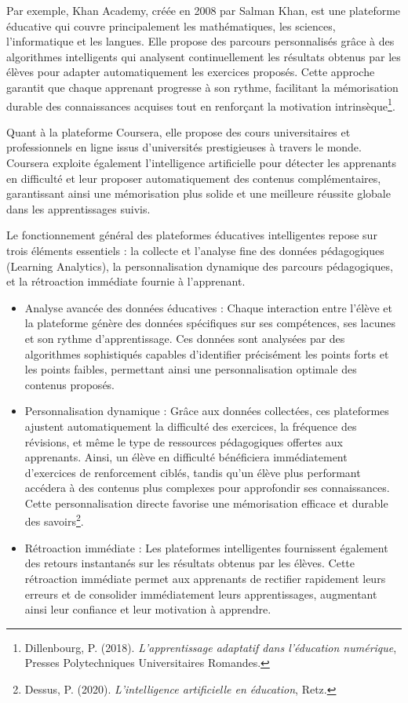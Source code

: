 \documentclass[12pt,a4paper]{report}
\begin{document}
Par exemple, Khan Academy, créée en 2008 par Salman Khan, est une plateforme éducative qui couvre principalement les mathématiques, les sciences, l’informatique et les langues. Elle propose des parcours personnalisés grâce à des algorithmes intelligents qui analysent continuellement les résultats obtenus par les élèves pour adapter automatiquement les exercices proposés. Cette approche garantit que chaque apprenant progresse à son rythme, facilitant la mémorisation durable des connaissances acquises tout en renforçant la motivation intrinsèque\footnote{Dillenbourg, P. (2018). \textit{L’apprentissage adaptatif dans l’éducation numérique}, Presses Polytechniques Universitaires Romandes.}.

Quant à la plateforme Coursera, elle propose des cours universitaires et professionnels en ligne issus d’universités prestigieuses à travers le monde. Coursera exploite également l’intelligence artificielle pour détecter les apprenants en difficulté et leur proposer automatiquement des contenus complémentaires, garantissant ainsi une mémorisation plus solide et une meilleure réussite globale dans les apprentissages suivis.

Le fonctionnement général des plateformes éducatives intelligentes repose sur trois éléments essentiels : la collecte et l’analyse fine des données pédagogiques (Learning Analytics), la personnalisation dynamique des parcours pédagogiques, et la rétroaction immédiate fournie à l’apprenant.

\begin{itemize}

    \item Analyse avancée des données éducatives :
Chaque interaction entre l’élève et la plateforme génère des données spécifiques sur ses compétences, ses lacunes et son rythme d’apprentissage. Ces données sont analysées par des algorithmes sophistiqués capables d’identifier précisément les points forts et les points faibles, permettant ainsi une personnalisation optimale des contenus proposés.

    \item Personnalisation dynamique :
Grâce aux données collectées, ces plateformes ajustent automatiquement la difficulté des exercices, la fréquence des révisions, et même le type de ressources pédagogiques offertes aux apprenants. Ainsi, un élève en difficulté bénéficiera immédiatement d’exercices de renforcement ciblés, tandis qu’un élève plus performant accédera à des contenus plus complexes pour approfondir ses connaissances. Cette personnalisation directe favorise une mémorisation efficace et durable des savoirs\footnote{Dessus, P. (2020). \textit{L’intelligence artificielle en éducation}, Retz.}.

    \item Rétroaction immédiate :
Les plateformes intelligentes fournissent également des retours instantanés sur les résultats obtenus par les élèves. Cette rétroaction immédiate permet aux apprenants de rectifier rapidement leurs erreurs et de consolider immédiatement leurs apprentissages, augmentant ainsi leur confiance et leur motivation à apprendre.
\end{itemize}
\end{document}
